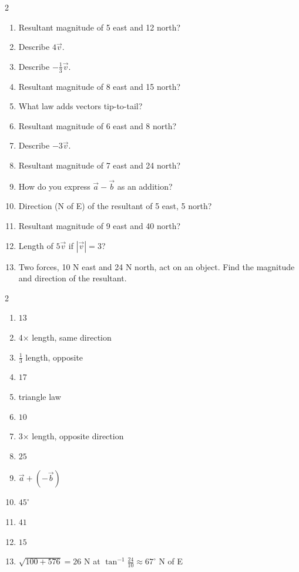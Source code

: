 \documentclass[11pt]{article}
\begin{document}
\begin{recapbox}
\begin{multicols}{2}
\small
\begin{enumerate}[leftmargin=*,itemsep=3pt]
  \item Resultant magnitude of 5 east and 12 north?
  \item Describe $4\vec v$.
  \item Describe $-\tfrac13\vec v$.
  \item Resultant magnitude of 8 east and 15 north?
  \item What law adds vectors tip-to-tail?
  \item Resultant magnitude of 6 east and 8 north?
  \item Describe $-3\vec v$.
  \item Resultant magnitude of 7 east and 24 north?
  \item How do you express $\vec a-\vec b$ as an addition?
  \item Direction (N of E) of the resultant of 5 east, 5 north?
  \item Resultant magnitude of 9 east and 40 north?
  \item Length of $5\vec v$ if $|\vec v|=3$?
  \item Two forces, 10 N east and 24 N north, act on an object. Find the magnitude and direction of the resultant.
\end{enumerate}
\end{multicols}
\end{recapbox}

\begin{keybox}
\begin{multicols}{2}
\small
\begin{enumerate}[leftmargin=*,itemsep=3pt]
  \item $13$
  \item 4× length, same direction
  \item $\tfrac13$ length, opposite
  \item $17$
  \item triangle law
  \item $10$
  \item 3× length, opposite direction
  \item $25$
  \item $\vec a+(-\vec b)$
  \item $45^\circ$
  \item $41$
  \item $15$
  \item $\sqrt{100+576}=26$ N at $\tan^{-1}\tfrac{24}{10}\approx67^\circ$ N of E
\end{enumerate}
\end{multicols}
\end{keybox}
\end{document}
